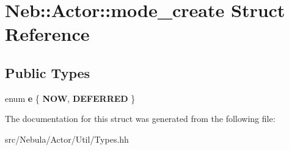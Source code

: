 \hypertarget{structNeb_1_1Actor_1_1mode__create}{\section{\-Neb\-:\-:\-Actor\-:\-:mode\-\_\-create \-Struct \-Reference}
\label{structNeb_1_1Actor_1_1mode__create}
}
\subsection*{\-Public \-Types}
\begin{DoxyCompactItemize}
\item 
enum {\bfseries e} \{ {\bfseries \-N\-O\-W}, 
{\bfseries \-D\-E\-F\-E\-R\-R\-E\-D}
 \}
\end{DoxyCompactItemize}


\-The documentation for this struct was generated from the following file\-:\begin{DoxyCompactItemize}
\item 
src/\-Nebula/\-Actor/\-Util/\-Types.\-hh\end{DoxyCompactItemize}
